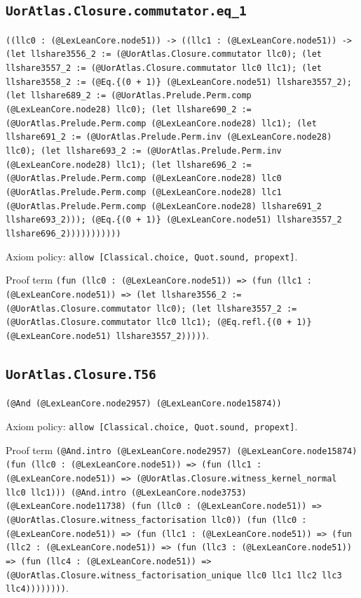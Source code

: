 \documentclass[11pt]{article}
\begin{document}
\subsection*{\texttt{UorAtlas.Closure.commutator.eq\_1}}
\noindent\texttt{((llc0 : (@LexLeanCore.node51)) -> ((llc1 : (@LexLeanCore.node51)) -> (let llshare3556\_2 := (@UorAtlas.Closure.commutator llc0); (let llshare3557\_2 := (@UorAtlas.Closure.commutator llc0 llc1); (let llshare3558\_2 := (@Eq.\{(0 + 1)\} (@LexLeanCore.node51) llshare3557\_2); (let llshare689\_2 := (@UorAtlas.Prelude.Perm.comp (@LexLeanCore.node28) llc0); (let llshare690\_2 := (@UorAtlas.Prelude.Perm.comp (@LexLeanCore.node28) llc1); (let llshare691\_2 := (@UorAtlas.Prelude.Perm.inv (@LexLeanCore.node28) llc0); (let llshare693\_2 := (@UorAtlas.Prelude.Perm.inv (@LexLeanCore.node28) llc1); (let llshare696\_2 := (@UorAtlas.Prelude.Perm.comp (@LexLeanCore.node28) llc0 (@UorAtlas.Prelude.Perm.comp (@LexLeanCore.node28) llc1 (@UorAtlas.Prelude.Perm.comp (@LexLeanCore.node28) llshare691\_2 llshare693\_2))); (@Eq.\{(0 + 1)\} (@LexLeanCore.node51) llshare3557\_2 llshare696\_2)))))))))))}\par
\noindent Axiom policy: \texttt{allow [Classical.choice, Quot.sound, propext]}.\par
\noindent Proof term \texttt{(fun (llc0 : (@LexLeanCore.node51)) => (fun (llc1 : (@LexLeanCore.node51)) => (let llshare3556\_2 := (@UorAtlas.Closure.commutator llc0); (let llshare3557\_2 := (@UorAtlas.Closure.commutator llc0 llc1); (@Eq.refl.\{(0 + 1)\} (@LexLeanCore.node51) llshare3557\_2)))))}.\par
\subsection*{\texttt{UorAtlas.Closure.T56}}
\noindent\texttt{(@And (@LexLeanCore.node2957) (@LexLeanCore.node15874))}\par
\noindent Axiom policy: \texttt{allow [Classical.choice, Quot.sound, propext]}.\par
\noindent Proof term \texttt{(@And.intro (@LexLeanCore.node2957) (@LexLeanCore.node15874) (fun (llc0 : (@LexLeanCore.node51)) => (fun (llc1 : (@LexLeanCore.node51)) => (@UorAtlas.Closure.witness\_kernel\_normal llc0 llc1))) (@And.intro (@LexLeanCore.node3753) (@LexLeanCore.node11738) (fun (llc0 : (@LexLeanCore.node51)) => (@UorAtlas.Closure.witness\_factorisation llc0)) (fun (llc0 : (@LexLeanCore.node51)) => (fun (llc1 : (@LexLeanCore.node51)) => (fun (llc2 : (@LexLeanCore.node51)) => (fun (llc3 : (@LexLeanCore.node51)) => (fun (llc4 : (@LexLeanCore.node51)) => (@UorAtlas.Closure.witness\_factorisation\_unique llc0 llc1 llc2 llc3 llc4))))))))}.\par
\end{document}
